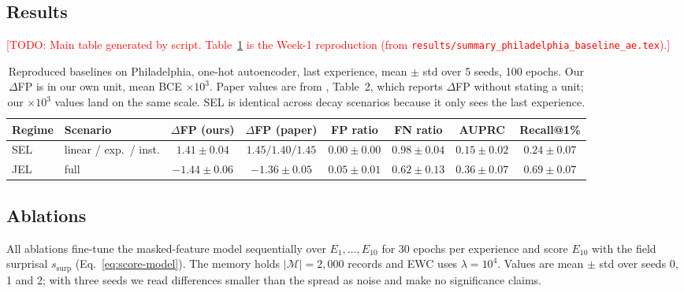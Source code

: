 \documentclass{article} %
\newcommand{\todo}[1]{\textcolor{red}{[TODO: #1]}}
\begin{document}
\subsection{Results}
\todo{Main table generated by script. Table~\ref{tab:baselines} is the Week-1 reproduction (from \texttt{results/summary\_philadelphia\_baseline\_ae.tex}).}
\begin{table}[h]
\centering\small
\caption{Reproduced baselines on Philadelphia, one-hot autoencoder, last experience, mean $\pm$ std over
5 seeds, 100 epochs. Our $\Delta$FP is in our own unit, mean BCE $\times10^{3}$. Paper values are from
\citet{hemati2022continual}, Table~2, which reports $\Delta$FP without stating a unit; our
$\times10^{3}$ values land on the same scale. SEL is identical across decay scenarios because it only sees
the last experience.}
\label{tab:baselines}
\begin{tabular}{llcccccc}
\toprule
Regime & Scenario & $\Delta$FP (ours) & $\Delta$FP (paper) & FP ratio & FN ratio & AUPRC & Recall@1\% \\
\midrule
SEL & linear / exp.\ / inst. & $1.41 \pm 0.04$ & $1.45 / 1.40 / 1.45$ & $0.00 \pm 0.00$ & $0.98 \pm 0.04$ & $0.15 \pm 0.02$ & $0.24 \pm 0.07$ \\
JEL & full & $-1.44 \pm 0.06$ & $-1.36 \pm 0.05$ & $0.05 \pm 0.01$ & $0.62 \pm 0.13$ & $0.36 \pm 0.07$ & $0.69 \pm 0.07$ \\
\bottomrule
\end{tabular}
\end{table}
\subsection{Ablations}
All ablations fine-tune the masked-feature model sequentially over
$E_1,\dots,E_{10}$ for 30 epochs per experience and score $E_{10}$ with the
field surprisal $s_{\text{surp}}$ (Eq.~\eqref{eq:score-model}). The memory holds
$|\mathcal{M}| = 2{,}000$ records and EWC uses $\lambda = 10^{4}$. Values are
mean $\pm$ std over seeds 0, 1 and 2; with three seeds we read differences
smaller than the spread as noise and make no significance claims.
\end{document}
